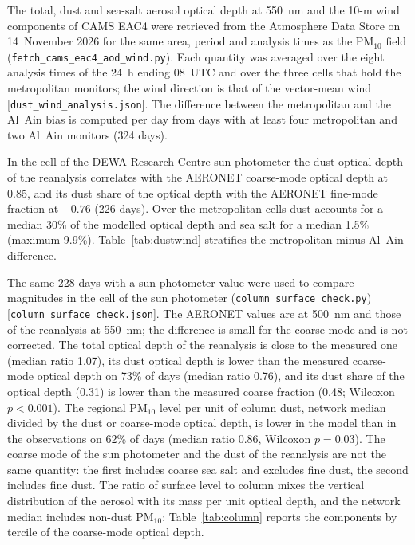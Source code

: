 \documentclass[11pt]{article}
\newcommand*{\ugm}{\ensuremath{\mu\mathrm{g\,m^{-3}}}}
\newcommand*{\pmten}{\ensuremath{\mathrm{PM_{10}}}}
\begin{document}
The total, dust and sea-salt aerosol optical depth at 550~nm and the 10-m wind components of
CAMS EAC4 were retrieved from the Atmosphere Data Store on 14~November 2026 for the same area,
period and analysis times as the \pmten{} field (\texttt{fetch\_cams\_eac4\_aod\_wind.py}). Each
quantity was averaged over the eight analysis times of the 24~h ending 08~UTC and over the three
cells that hold the metropolitan monitors; the wind direction is that of the vector-mean wind
[\texttt{dust\_wind\_analysis.json}]. The difference between the metropolitan and the Al~Ain bias
is computed per day from days with at least four metropolitan and two Al~Ain monitors (324 days).

In the cell of the DEWA Research Centre sun photometer the dust optical depth of the reanalysis
correlates with the AERONET coarse-mode optical depth at 0.85, and its dust share of the optical
depth with the AERONET fine-mode fraction at $-0.76$ (226 days). Over the metropolitan cells dust
accounts for a median 30\% of the modelled optical depth and sea salt for a median 1.5\%
(maximum 9.9\%). Table~\ref{tab:dustwind} stratifies the metropolitan minus Al~Ain difference.

\begin{table}[ht]\centering\small
\caption{Metropolitan minus Al~Ain bias (median over days, \ugm{}; in brackets without
Al~Mafraq) by tercile of the CAMS dust optical depth and of the 10-m wind speed over the
metropolitan cells and by wind sector, and Spearman correlations. The Mann--Whitney test of the
two wind sectors gives $p=0.22$.}
\label{tab:dustwind}
\resizebox{\textwidth}{!}{}
\end{table}

The same 228 days with a sun-photometer value were used to compare magnitudes in the cell of the
sun photometer (\texttt{column\_surface\_check.py}) [\texttt{column\_surface\_check.json}]. The
AERONET values are at 500~nm and those of the reanalysis at 550~nm; the difference is small for the
coarse mode and is not corrected. The total optical depth of the reanalysis is close to the
measured one (median ratio 1.07), its dust optical depth is lower than the measured coarse-mode
optical depth on 73\% of days (median ratio 0.76), and its dust share of the optical depth (0.31)
is lower than the measured coarse fraction (0.48; Wilcoxon $p<0.001$). The regional \pmten{} level
per unit of column dust, network median divided by the dust or coarse-mode optical depth, is lower
in the model than in the observations on 62\% of days (median ratio 0.86, Wilcoxon $p=0.03$). The
coarse mode of the sun photometer and the dust of the reanalysis are not the same quantity: the
first includes coarse sea salt and excludes fine dust, the second includes fine dust. The ratio of
surface level to column mixes the vertical distribution of the aerosol with its mass per unit
optical depth, and the network median includes non-dust \pmten{}; Table~\ref{tab:column} reports
the components by tercile of the coarse-mode optical depth.

\begin{table}[ht]\centering\small
\caption{Column and surface in the cell of the DEWA Research Centre sun photometer: medians over
days, for all days and by tercile of the AERONET coarse-mode optical depth (number of days in
brackets).}
\label{tab:column}

\end{table}
\end{document}

